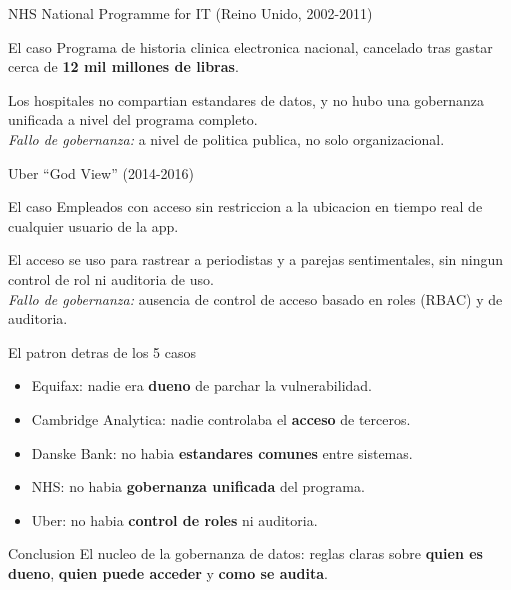 \documentclass[aspectratio=169]{beamer}
\begin{document}
\begin{frame}{NHS National Programme for IT (Reino Unido, 2002-2011)}
  \begin{block}{El caso}
    Programa de historia clinica electronica nacional, cancelado tras gastar
    cerca de \textbf{12 mil millones de libras}.
  \end{block}
  Los hospitales no compartian estandares de datos, y no hubo una gobernanza
  unificada a nivel del programa completo.
  \vspace{0.2em}\\
  \textit{Fallo de gobernanza:} a nivel de politica publica, no solo
  organizacional.
\end{frame}

\begin{frame}{Uber ``God View'' (2014-2016)}
  \begin{block}{El caso}
    Empleados con acceso sin restriccion a la ubicacion en tiempo real de
    cualquier usuario de la app.
  \end{block}
  El acceso se uso para rastrear a periodistas y a parejas sentimentales,
  sin ningun control de rol ni auditoria de uso.
  \vspace{0.2em}\\
  \textit{Fallo de gobernanza:} ausencia de control de acceso basado en
  roles (RBAC) y de auditoria.
\end{frame}

\begin{frame}{El patron detras de los 5 casos}
  \begin{itemize}
    \item Equifax: nadie era \textbf{dueno} de parchar la vulnerabilidad.
    \item Cambridge Analytica: nadie controlaba el \textbf{acceso} de
          terceros.
    \item Danske Bank: no habia \textbf{estandares comunes} entre sistemas.
    \item NHS: no habia \textbf{gobernanza unificada} del programa.
    \item Uber: no habia \textbf{control de roles} ni auditoria.
  \end{itemize}
  \begin{block}{Conclusion}
    El nucleo de la gobernanza de datos: reglas claras sobre \textbf{quien es
    dueno}, \textbf{quien puede acceder} y \textbf{como se audita}.
  \end{block}
\end{frame}
\end{document}
